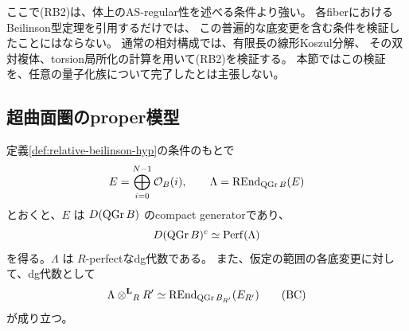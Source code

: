 ここで(RB2)は、体上のAS-regular性を述べる条件より強い。
各fiberにおけるBeilinson型定理を引用するだけでは、
この普遍的な底変更を含む条件を検証したことにはならない。
通常の相対構成では、有限長の線形Koszul分解、
その双対複体、torsion局所化の計算を用いて(RB2)を検証する。
本節ではこの検証を、任意の量子化族について完了したとは主張しない。

\subsection{超曲面圏のproper模型}

\begin{proposition}[相対proper模型]\label{prop:relative-proper-model}
 定義\ref{def:relative-beilinson-hyp}の条件のもとで
 \[
 E=\bigoplus_{i=0}^{N-1}\mathcal O_B(i),\qquad
 \Lambda=\operatorname{REnd}_{\operatorname{QGr} B}(E)
 \]
 とおくと、\(E\) は \(D(\operatorname{QGr} B)\) のcompact generatorであり、
 \[
 D(\operatorname{QGr} B)^c\simeq\operatorname{Perf}(\Lambda)
 \]
 を得る。\(\Lambda\) は \(R\)-perfectなdg代数である。
 また、仮定の範囲の各底変更に対して、dg代数として
 \[
 \Lambda\mathbin{\otimes^{\mathbf L}}_RR'\simeq
 \operatorname{REnd}_{\operatorname{QGr} B_{R'}}(E_{R'})
 \tag{BC}\label{eq:relative-proper-basechange}
 \]
 が成り立つ。
\end{proposition}

